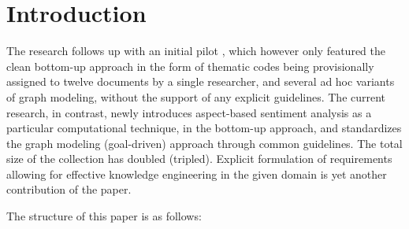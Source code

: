 \documentclass{kerauth}
\begin{document}
\begin{abstract}
\end{abstract}

\section{Introduction}

The research follows up with an initial pilot \cite{NguyenKCAP21}, which however only featured the clean bottom-up approach in the form of thematic codes being provisionally assigned to twelve documents by a single researcher, and several ad hoc variants of graph modeling, without the support of any explicit guidelines.
The current research, in contrast, newly introduces aspect-based sentiment analysis as a particular computational technique, in the bottom-up approach, and standardizes the graph modeling (goal-driven) approach through common guidelines.
The total size of the collection has doubled (tripled).
Explicit formulation of requirements allowing for effective knowledge engineering in the given domain is yet another contribution of the paper.

The structure of this paper is as follows: 
\end{document}
